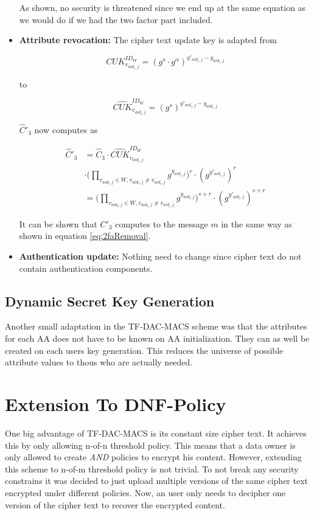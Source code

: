 \begin{itemize}
As shown, no security is threatened since we end up at the same equation as we would do if we had the two factor part included. 

\item \textbf{Attribute revocation:}
The cipher text update key is adapted from

$$
CUK^{ID_W}_{v_{aid_i,j}} = (g^s \cdotp g^\alpha)^{y'_{aid_i,j} - y_{aid_i,j}}
$$

to 

$$
\widehat{CUK}^{ID_W}_{v_{aid_i,j}} = (g^s)^{y'_{aid_i,j} - y_{aid_i,j}}
$$

$\widehat{C}'_3$ now computes as 

\begin{equation}
\begin{split}
\widehat{C}'_3 &= \widehat{C}_3 \cdotp \widehat{CUK}^{ID_W}_{v_{aid_i,j}} \\
&\cdotp \Big( \prod_{v_{aid_{t}, j}\in W, v_{aid_t, j} \neq v_{aid_i,j}} g^{y_{aid_{i}, j}} \Big)^{r} \cdotp (g^{y'_{aid_i,j}})^{r} \\
&= \Big( \prod_{v_{aid_{t}, j}\in W, v_{aid_t, j} \neq v_{aid_i,j}} g^{y_{aid_{i}, j}} \Big)^{s + r} \cdotp (g^{y'_{aid_i,j}})^{s + r}
\end{split}
\end{equation}

It can be shown that $C'_3$ computes to the message $m$ in the same way as shown in equation \ref{eq:2faRemoval}.

\item \textbf{Authentication update:}
Nothing need to change since cipher text do not contain authentication components. 
\end{itemize}

\subsection{Dynamic Secret Key Generation}
Another small adaptation in the \ac{TF-DAC-MACS} scheme was that the attributes for each \ac{AA} does not have to be known on AA initialization. They can as well be created on each users key generation. This reduces the universe of possible attribute values to thous who are actually needed.

\section{Extension To DNF-Policy}
\label{sec:extension-to-dnf-policy}
One big advantage of TF-DAC-MACS is its constant size cipher text. It achieves this by only allowing n-of-n threshold policy. This means that a data owner is only allowed to create \textit{AND} policies to encrypt his content. However, extending this scheme to n-of-m threshold policy is not trivial. To not break any security constrains it was decided to just upload multiple versions of the same cipher text encrypted under different policies. Now, an user only needs to decipher one version of the cipher text to recover the encrypted content. 

